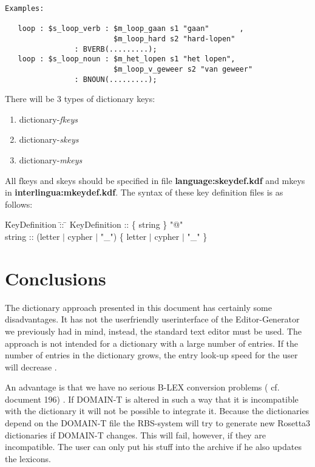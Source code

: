 \begin{verbatim}
Examples:

   loop : $s_loop_verb : $m_loop_gaan s1 "gaan"       ,
                         $m_loop_hard s2 "hard-lopen" 
                : BVERB(.........);
   loop : $s_loop_noun : $m_het_lopen s1 "het lopen",
                         $m_loop_v_geweer s2 "van geweer"
                : BNOUN(.........);
\end{verbatim}            

There will be 3 types of dictionary keys:
\begin{enumerate}
   \item dictionary-{\em fkeys}
   \item dictionary-{\em skeys}
   \item dictionary-{\em mkeys}
\end{enumerate}

All fkeys and skeys should be
specified in file {\bf language:skeydef.kdf}
and
mkeys in {\bf interlingua:mkeydef.kdf}. The syntax of these key definition 
files is as follows:\\

\begin {tabbing}
   \= KeyDefinition \= :: \= \kill
   \> KeyDefinition \> :: \{ string \} "@" \\
   \> string        \> :: (letter $\mid$ cypher $\mid$ "\_") \{ letter $\mid$ cypher $\mid$ "\_" \} \\
\end {tabbing}

\section {Conclusions}
The dictionary approach presented in this document has certainly some 
disadvantages. It has not the userfriendly userinterface of the 
Editor-Generator we previously had in mind,  instead, the standard text editor
must be used. 
The approach is not intended for a dictionary with a large number of 
entries. If the number of entries in the dictionary grows, the entry look-up 
speed for the user will decrease .

An advantage is that we have no serious B-LEX conversion problems ( cf. document 196) .
If DOMAIN-T is altered in such a way that it is incompatible with
the dictionary it will not be possible to integrate it. Because
the dictionaries depend on the DOMAIN-T file the RBS-system will try to 
generate 
new Rosetta3 dictionaries if DOMAIN-T changes. This will fail, however, if
they are incompatible. The user can only put his stuff into the archive if he 
also updates the lexicons.


